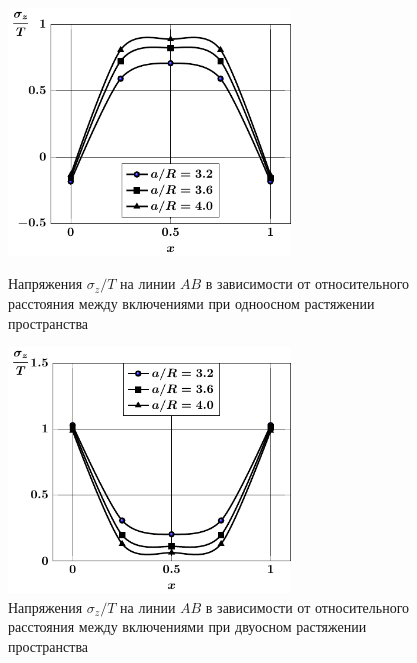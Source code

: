 \begin{figure}[h!]
\centering\footnotesize
\parbox[b]{7.5cm}{\centering\includegraphics[width=7.5cm]{inc5-a-d95-g25-t1-ab-sig_z.pdf}
\caption{Напряжения $\sigma_z/T$ на линии  $AB$ в зависимости от относительного расстояния между включениями при одноосном растяжении пространства
\label{f:8:58}}}\hfil\hfil
\parbox[b]{7.5cm}{\centering\includegraphics[width=7.5cm]{inc5-a-d95-g25-t2-ab-sig_z.pdf}
\caption{Напряжения $\sigma_z/T$ на линии  $AB$ в зависимости от относительного расстояния между включениями при двуосном растяжении пространства
\label{f:8:59}}}
\end{figure}


